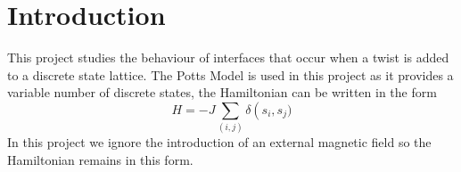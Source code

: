 \chapter{Introduction}

This project studies the behaviour of interfaces that occur when a twist is added to a discrete state lattice.
The Potts Model is used in this project as it provides a variable number of discrete states, the Hamiltonian can be written in the form
\begin{equation}
H = -J\sum_{(i,j)} \delta\left(s_i,s_j)
\end{equation}
In this project we ignore the introduction of an external magnetic field so the Hamiltonian remains in this form.